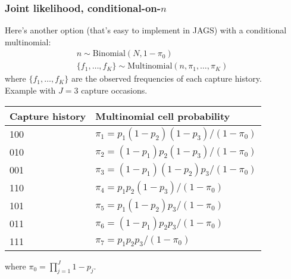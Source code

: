 \documentclass[color=usenames,dvipsnames]{beamer}\usepackage[]{graphicx}\usepackage[]{color}
\begin{document}
\begin{frame}
  \frametitle{Joint likelihood, conditional-on-$n$}
  \footnotesize
  Here's another option (that's easy to implement in JAGS) with a conditional multinomial: \\
  \begin{gather*}
    n \sim \mathrm{Binomial}\left(N, 1-\pi_0\right)                      \\
    \{f_1, \dots, f_K\} \sim \mathrm{Multinomial}(n, \pi_1, \dots, \pi_K) \;\;
  \end{gather*}
  where $\{f_1, \dots, f_K\}$ are the observed frequencies of each
  capture history. \\
  \pause \vfill
  Example with $J=3$ capture occasions.                                          \\
  \scriptsize
  \vspace{6pt}
  \centering
    \begin{tabular}{ll}
      \hline
      Capture history & Multinomial cell probability        \\
      \hline
      100                   & $\pi_1=p_1(1-p_2)(1-p_3)/(1-\pi_0)$ \\
      010                   & $\pi_2=(1-p_1)p_2(1-p_3)/(1-\pi_0)$ \\
      001                   & $\pi_3=(1-p_1)(1-p_2)p_3/(1-\pi_0)$ \\
      110                   & $\pi_4=p_1p_2(1-p_3)/(1-\pi_0)$     \\
      101                   & $\pi_5=p_1(1-p_2)p_3/(1-\pi_0)$     \\
      011                   & $\pi_6=(1-p_1)p_2p_3/(1-\pi_0)$     \\
      111                   & $\pi_7 = p_1p_2p_3/(1-\pi_0)$       \\
      \hline
    \end{tabular}
    \flushleft
  where $\pi_0=\prod_{j=1}^J 1-p_j$.                                     \\
\end{frame}
\end{document}
